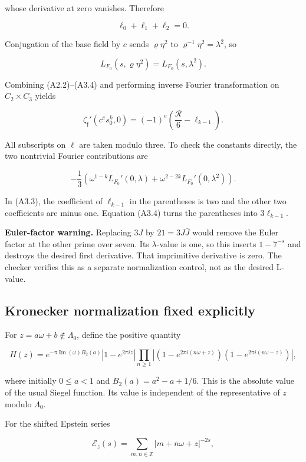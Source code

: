 whose derivative at zero vanishes. Therefore

\[
\ell_0+\ell_1+\ell_2=0. \tag{A3.4}
\]

Conjugation of the base field by \(c\) sends \(\varrho\eta^2\) to
\(\varrho^{-1}\eta^2=\lambda^2\), so

\[
L_{F_0}(s,\varrho\eta^2)=L_{F_0}(s,\lambda^2).
\]

Combining (A2.2)--(A3.4) and performing inverse Fourier transformation
on \(C_2\times C_3\) yields

\[
\boxed{\zeta_{\mathfrak f}'(c^e s_0^k,0)
=(-1)^e\left(\frac{\mathcal R}{6}-\ell_{k-1}\right).} \tag{A3.5}
\]

All subscripts on \(\ell\) are taken modulo three. To check the
constants directly, the two nontrivial Fourier contributions are

\[
-\frac13\left(\omega^{1-k}L_{F_0}'(0,\lambda)
+\omega^{2-2k}L_{F_0}'(0,\lambda^2)\right).
\]

In (A3.3), the coefficient of \(\ell_{k-1}\) in the parentheses is two
and the other two coefficients are minus one. Equation (A3.4) turns the
parentheses into \(3\ell_{k-1}\).

\textbf{Euler-factor warning.} Replacing \(3J\) by \(21=3J\bar J\) would
remove the Euler factor at the other prime over seven. Its
\(\lambda\)-value is one, so this inserts \(1-7^{-s}\) and destroys the
desired first derivative. That imprimitive derivative is zero. The
checker verifies this as a separate normalization control, not as the
desired L-value.

\hypertarget{A-kronecker-normalization-fixed-explicitly}{%
\subsection{Kronecker normalization fixed
explicitly}\label{A-kronecker-normalization-fixed-explicitly}}

For \(z=a\omega+b\notin\Lambda_0\), define the positive quantity

\[
H(z)=e^{-\pi\operatorname{Im}(\omega)B_2(a)}
|1-e^{2\pi iz}|
\prod_{n\ge1}|(1-e^{2\pi i(n\omega+z)})(1-e^{2\pi i(n\omega-z)})|,
\tag{A4.1}
\]

where initially \(0\le a<1\) and \(B_2(a)=a^2-a+1/6\). This is the
absolute value of the usual Siegel function. Its value is independent of
the representative of \(z\) modulo \(\Lambda_0\).

For the shifted Epstein series

\[
\mathcal E_z(s)=\sum_{m,n\in\mathbb Z}|m+n\omega+z|^{-2s},
\]

